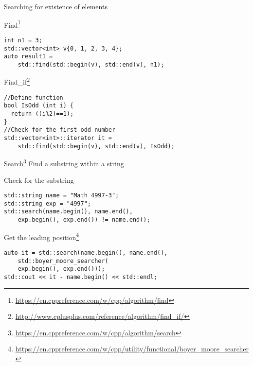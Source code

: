 \documentclass[\classoption]{beamer}
\begin{document}
\begin{frame}[fragile]{Searching for existence of elements}
\begin{block}{Find\footnote{\tiny\url{https://en.cppreference.com/w/cpp/algorithm/find}}}
\begin{lstlisting}
int n1 = 3;
std::vector<int> v{0, 1, 2, 3, 4}; 
auto result1 = 
	std::find(std::begin(v), std::end(v), n1);
\end{lstlisting}
\end{block}

\begin{block}{Find\_if\footnote{\tiny\url{http://www.cplusplus.com/reference/algorithm/find_if/}}}
\begin{lstlisting}
//Define function
bool IsOdd (int i) {
  return ((i%2)==1);
}
//Check for the first odd number
std::vector<int>::iterator it = 
	std::find(std::begin(v), std::end(v), IsOdd);
\end{lstlisting}
\end{block}

\end{frame}


\begin{frame}[fragile]{Search\footnote{\tiny\url{https://en.cppreference.com/w/cpp/algorithm/search}}}
Find a substring within a string

\begin{block}{Check for the substring }
\begin{lstlisting}
std::string name = "Math 4997-3";
std::string exp = "4997";
std::search(name.begin(), name.end(), 
	exp.begin(), exp.end()) != name.end();
\end{lstlisting}
\end{block}

\begin{block}{Get the leading position\footnote{\tiny\url{https://en.cppreference.com/w/cpp/utility/functional/boyer_moore_searcher}}}
\begin{lstlisting}
auto it = std::search(name.begin(), name.end(),
	std::boyer_moore_searcher(
	exp.begin(), exp.end()));
std::cout << it - name.begin() << std::endl;
\end{lstlisting}
\end{block}

\end{frame}
\end{document}
